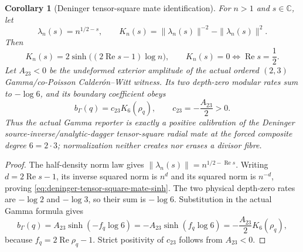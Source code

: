 \documentclass[11pt]{article}
\newtheorem{corollary}[theorem]{Corollary}
\theoremstyle{definition}
\theoremstyle{remark}
\newcommand{\C}{\mathbb C}
\newcommand{\Rea}{\operatorname{Re}}
\begin{document}
\begin{corollary}[Deninger tensor-square mate identification]
\label{cor:gamma-deninger-tensor-square-mate}
For \(n>1\) and \(s\in\C\), let
\[
 \lambda_n(s)=n^{1/2-s},
 \qquad
 K_n(s)=\|\lambda_n(s)\|^{-2}-\|\lambda_n(s)\|^2.
\tag{7.6R4}\label{eq:deninger-tensor-square-mate-curvature}
\]
Then
\[
 K_n(s)=2\sinh\!\bigl((2\Rea s-1)\log n\bigr),
 \qquad
 K_n(s)=0\Longleftrightarrow\Rea s=\frac12.
\tag{7.6R5}\label{eq:deninger-tensor-square-mate-sinh}
\]
Let \(A_{23}<0\) be the undeformed exterior amplitude of the actual ordered
\((2,3)\) Gamma/co-Poisson Calder\'on--Witt witness.  Its two depth-zero
modular rates sum to \(-\log6\), and its boundary coefficient obeys
\[
 \boxed{
 b_\Gamma(q)=c_{23}K_6(\rho_q),
 \qquad
 c_{23}=-\frac{A_{23}}2>0.}
\tag{7.6R6}\label{eq:gamma-deninger-tensor-square-mate}
\]
Thus the actual Gamma reporter is exactly a positive calibration of the
Deninger source-inverse/analytic-dagger tensor-square radial mate at the
forced composite degree \(6=2\cdot3\); normalization neither creates nor
erases a divisor fibre.
\end{corollary}

\begin{proof}
The half-density norm law gives
\(\|\lambda_n(s)\|=n^{1/2-\Rea s}\).  Writing
\(d=2\Rea s-1\), its inverse squared norm is \(n^d\) and its squared norm is
\(n^{-d}\), proving \eqref{eq:deninger-tensor-square-mate-sinh}.  The two
physical depth-zero rates are \(-\log2\) and \(-\log3\), so their sum is
\(-\log6\).  Substitution in the actual Gamma formula gives
\[
 b_\Gamma(q)
 =A_{23}\sinh(-f_q\log6)
 =-A_{23}\sinh(f_q\log6)
 =-\frac{A_{23}}2K_6(\rho_q),
\]
because \(f_q=2\Rea\rho_q-1\).  Strict positivity of \(c_{23}\) follows
from \(A_{23}<0\).
\end{proof}
\end{document}
